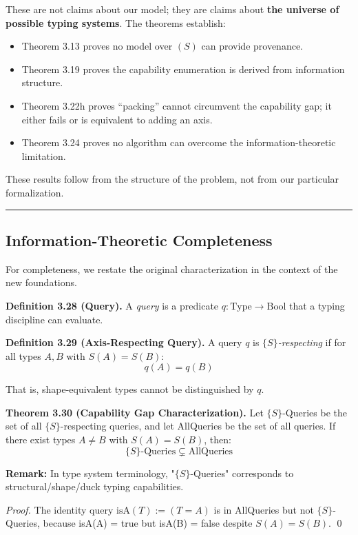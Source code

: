 These are not claims about our model; they are claims about \textbf{the
universe of possible typing systems}. The theorems establish:
\begin{itemize}
\tightlist
\item Theorem 3.13 proves no model over $(S)$ can provide provenance.
\item Theorem 3.19 proves the capability enumeration is derived from information structure.
\item Theorem 3.22h proves ``packing'' cannot circumvent the capability gap; it either fails or is equivalent to adding an axis.
\item Theorem 3.24 proves no algorithm can overcome the information-theoretic limitation.
\end{itemize}

These results follow from the structure of the problem, not from our particular formalization.

\begin{center}\rule{0.5\linewidth}{0.5pt}\end{center}

\subsection{Information-Theoretic
Completeness}\label{information-theoretic-completeness}

For completeness, we restate the original characterization in the
context of the new foundations.

\textbf{Definition 3.28 (Query).} A \emph{query} is a predicate
\(q : \text{Type} \to \text{Bool}\) that a typing discipline can
evaluate.

\textbf{Definition 3.29 (Axis-Respecting Query).} A query \(q\) is
\emph{$\{S\}$-respecting} if for all types \(A, B\) with \(S(A) = S(B)\):
\[q(A) = q(B)\]

That is, shape-equivalent types cannot be distinguished by \(q\).

\textbf{Theorem 3.30 (Capability Gap Characterization).} Let
$\{S\}$-Queries be the set of all $\{S\}$-respecting queries, and let
AllQueries be the set of all queries. If there exist types \(A \neq B\)
with \(S(A) = S(B)\), then:
\[\text{$\{S\}$-Queries} \subsetneq \text{AllQueries}\]

\textbf{Remark:} In type system terminology, "$\{S\}$-Queries" corresponds to structural/shape/duck typing capabilities.

\emph{Proof.} The identity query \(\text{isA}(T) := (T = A)\) is in
AllQueries but not $\{S\}$-Queries, because isA(A) = true but isA(B) =
false despite \(S(A) = S(B)\). \qed

